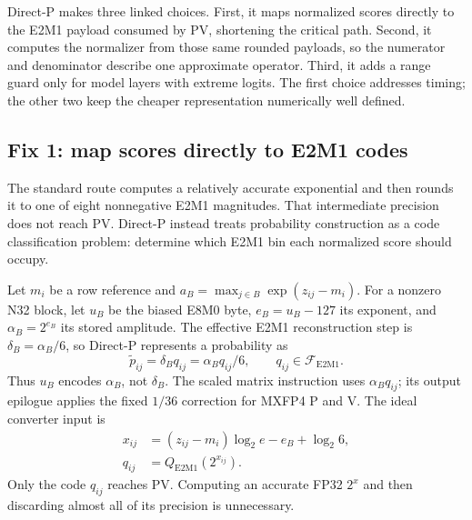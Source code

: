 Direct-P makes three linked choices.  First, it maps normalized scores
directly to the E2M1 payload consumed by PV, shortening the critical path.
Second, it computes the normalizer from those same rounded payloads, so the
numerator and denominator describe one approximate operator.  Third, it adds
a range guard only for model layers with extreme logits.  The first choice
addresses timing; the other two keep the cheaper representation numerically
well defined.

\subsection{Fix 1: map scores directly to E2M1 codes}

The standard route computes a relatively accurate exponential and then rounds
it to one of eight nonnegative E2M1 magnitudes.  That intermediate precision does
not reach PV.  Direct-P instead treats probability construction as a code
classification problem: determine which E2M1 bin each normalized score should
occupy.

Let $m_i$ be a row reference and
$a_B=\max_{j\in B}\exp(z_{ij}-m_i)$. For a nonzero N32 block, let $u_B$ be
the biased E8M0 byte, $e_B=u_B-127$ its exponent, and
$\alpha_B=2^{e_B}$ its stored amplitude. The effective E2M1 reconstruction
step is $\delta_B=\alpha_B/6$, so Direct-P represents a probability as
\begin{equation}
  \widetilde p_{ij}=\delta_B q_{ij}=\alpha_B q_{ij}/6,
  \qquad q_{ij}\in\mathcal F_{\mathrm{E2M1}}.
  \label{eq:represented-probability}
\end{equation}
Thus $u_B$ encodes $\alpha_B$, not $\delta_B$.  The scaled matrix instruction
uses $\alpha_Bq_{ij}$; its output epilogue applies the fixed $1/36$ correction
for MXFP4 P and V.
The ideal converter input is
\begin{align}
  x_{ij} &= (z_{ij}-m_i)\log_2 e-e_B+\log_2 6, \\
  q_{ij} &= Q_{\mathrm{E2M1}}(2^{x_{ij}}).
  \label{eq:ideal-code-path}
\end{align}
Only the code $q_{ij}$ reaches PV. Computing an accurate FP32 $2^x$ and then
discarding almost all of its precision is unnecessary.

